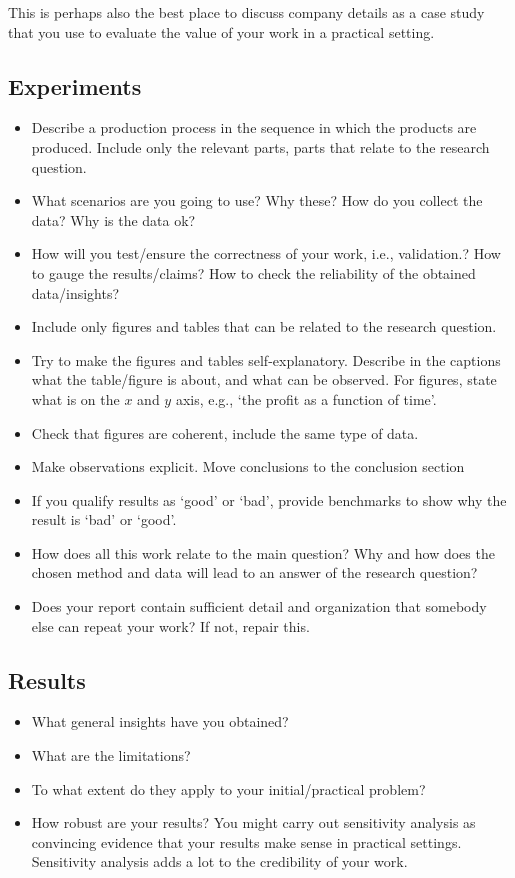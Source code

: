 \documentclass{article}
\begin{document}
This is perhaps also the best place to discuss company details as a
case study that you use to evaluate the value of your work in a
practical setting.

\subsection{Experiments}
\label{sec:experiments}


\begin{itemize}
\item Describe a production process in the sequence in which the
  products are produced. Include only the relevant parts, parts that
  relate to the research question.
\item What scenarios are you going to use? Why these? How do you
  collect the data? Why is the data ok?
\item How will you test/ensure the correctness of your work, i.e.,
  validation.? How to gauge the results/claims? How to check the
  reliability of the obtained data/insights?
\item Include only figures and tables that can be related to the
  research question.
\item Try to make the figures and tables self-explanatory. Describe in
  the captions what the table/figure is about, and what can be
  observed. For figures, state what is on the $x$ and $y$ axis, e.g.,
  `the profit as a function of time'.
\item Check that figures are coherent, include the same type of data.
\item Make observations explicit.  Move conclusions to the conclusion section
\item If you qualify results as `good' or `bad', provide benchmarks to
  show why the result is `bad' or `good'.
\item How does all this work relate to the main question? Why and how
  does the chosen method and data will lead to an answer of the
  research question?
\item Does your report contain sufficient detail and organization that
  somebody else can repeat your work? If not, repair this.
\end{itemize}


\subsection{Results}
\label{sec:results}

\begin{itemize}
\item What general insights have  you obtained?
\item What are the limitations?
\item To what extent do they apply to your initial/practical problem?
\item How robust are your results? You might carry out sensitivity
  analysis as convincing evidence that your results make sense in
  practical settings. Sensitivity analysis adds a lot to the
  credibility of your work.
\end{itemize}
\end{document}
